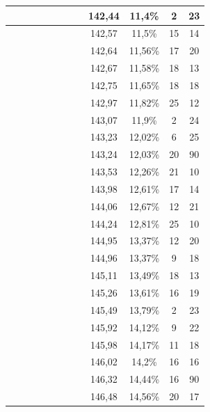 \begin{center}
\begin{longtable}{|c|c|c|c|c|c|c|c|c|c|c|c|}
 \x &  \x &  &  \x &  \x &  &  &  \x & 142,44 & 11,4\% & 2 & 23  \\ \hline
 \x &  \x &  \x &  &  &  \x &  \x &  \x & 142,57 & 11,5\% & 15 & 14  \\ \hline
 \x &  \x &  &  \x &  &  \x &  &  \x & 142,64 & 11,56\% & 17 & 20  \\ \hline
 \x &  &  \x &  &  &  \x &  &  \x & 142,67 & 11,58\% & 18 & 13  \\ \hline
 \x &  \x &  \x &  &  \x &  &  &  & 142,75 & 11,65\% & 18 & 18  \\ \hline
 \x &  &  \x &  \x &  \x &  \x &  &  \x & 142,97 & 11,82\% & 25 & 12  \\ \hline
 \x &  \x &  &  &  \x &  &  &  \x & 143,07 & 11,9\% & 2 & 24  \\ \hline
 \x &  \x &  \x &  &  &  &  \x &  \x & 143,23 & 12,02\% & 6 & 25  \\ \hline
 \x &  &  \x &  \x &  &  \x &  &  \x & 143,24 & 12,03\% & 20 & 90  \\ \hline
 \x &  \x &  &  \x &  &  &  &  \x & 143,53 & 12,26\% & 21 & 10  \\ \hline
 \x &  \x &  &  &  \x &  &  &  & 143,98 & 12,61\% & 17 & 14  \\ \hline
 \x &  \x &  \x &  &  \x &  &  &  \x & 144,06 & 12,67\% & 12 & 21  \\ \hline
 \x &  \x &  \x &  &  &  \x &  \x &  & 144,24 & 12,81\% & 25 & 10  \\ \hline
 \x &  &  &  \x &  \x &  \x &  &  & 144,95 & 13,37\% & 12 & 20  \\ \hline
 \x &  \x &  \x &  &  \x &  \x &  &  & 144,96 & 13,37\% & 9 & 18  \\ \hline
 \x &  &  &  &  &  \x &  &  \x & 145,11 & 13,49\% & 18 & 13  \\ \hline
 \x &  \x &  &  \x &  \x &  \x &  &  & 145,26 & 13,61\% & 16 & 19  \\ \hline
 \x &  \x &  \x &  \x &  &  &  &  \x & 145,49 & 13,79\% & 2 & 23  \\ \hline
 \x &  &  \x &  &  \x &  \x &  \x &  & 145,92 & 14,12\% & 9 & 22  \\ \hline
 \x &  &  \x &  &  \x &  &  \x &  \x & 145,98 & 14,17\% & 11 & 18  \\ \hline
 \x &  &  \x &  &  &  &  \x &  \x & 146,02 & 14,2\% & 16 & 16  \\ \hline
 \x &  \x &  \x &  \x &  &  &  \x &  \x & 146,32 & 14,44\% & 16 & 90  \\ \hline
 \x &  &  \x &  \x &  &  &  &  \x & 146,48 & 14,56\% & 20 & 17  \\ \hline

\end{longtable}
\end{center}
